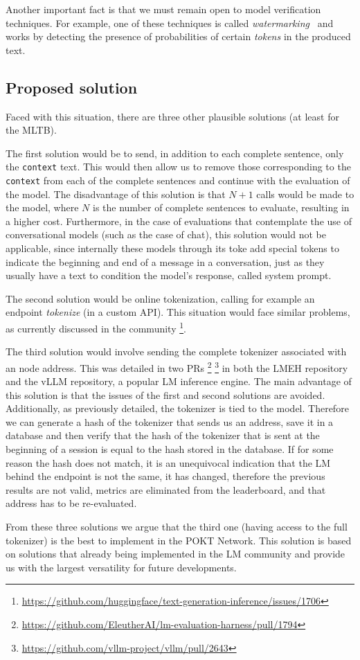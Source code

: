Another important fact is that we must remain open to model verification techniques. For example, one of these techniques is called \emph{watermarking}~\cite{kirchenbauer2023watermark} and works by detecting the presence of probabilities of certain \emph{tokens} in the produced text.


\subsection{Proposed solution}\label{subsec:b3}

Faced with this situation, there are three other plausible solutions (at least for the \gls{MLTB}). 

The first solution would be to send, in addition to each complete sentence, only the \texttt{context} text. 
This would then allow us to remove those corresponding to the \texttt{context} from each of the complete sentences and continue with the evaluation of the model. 
The disadvantage of this solution is that $N+1$ calls would be made to the model, where $N$ is the number of complete sentences to evaluate, resulting in a higher cost. 
Furthermore, in the case of evaluations that contemplate the use of conversational models (such as the case of chat), this solution would not be applicable, since internally these models through its toke add special tokens to indicate the beginning and end of a message in a conversation, just as they usually have a text to condition the model's response, called system prompt. 

The second solution would be online tokenization, calling for example an endpoint \emph{tokenize} (in a custom \gls{API}). 
This situation would face similar problems, as currently discussed in the community \footnote{\url{https://github.com/huggingface/text-generation-inference/issues/1706}}. 

The third solution would involve sending the complete tokenizer associated with an node address. 
This was detailed in two PRs \footnote{\url{https://github.com/EleutherAI/lm-evaluation-harness/pull/1794}} \footnote{\url{https://github.com/vllm-project/vllm/pull/2643}} in both the \gls{LMEH} repository and the vLLM repository, a popular \gls{LM} inference engine. 
The main advantage of this solution is that the issues of the first and second solutions are avoided. 
Additionally, as previously detailed, the tokenizer is tied to the model. 
Therefore we can generate a hash of the tokenizer that sends us an address, save it in a database and then verify that the hash of the tokenizer that is sent at the beginning of a session is equal to the hash stored in the database. 
If for some reason the hash does not match, it is an unequivocal indication that the \gls{LM} behind the endpoint is not the same, it has changed, therefore the previous results are not valid, metrics are eliminated from the leaderboard, and that address has to be re-evaluated. 

From these three solutions we argue that the third one (having access to the full tokenizer) is the best to implement in the POKT Network. This solution is based on solutions that already being implemented in the \gls{LM} community and provide us with the largest versatility for future developments.